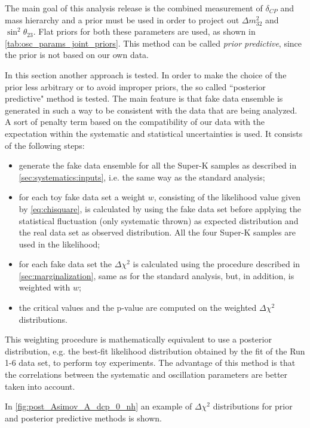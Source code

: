 The main goal of this analysis release is the combined measurement of $\delta_{CP}$ and mass hierarchy
and a prior must be used in order to project out $\Delta m^2_{32}$ and $\sin^2 \theta_{23}$.
Flat priors for both these parameters are used, as shown in \cref{tab:osc_params_joint_priors}.
This method can be called \emph{prior predictive}, since the prior is not based on our own data.

In this section another approach is tested. In order to make the choice of the prior less arbitrary
or to avoid improper priors, 
the so called ``posterior predictive" method is tested.
The main feature is that fake data ensemble is generated in such a way to be consistent with the data that are being analyzed. 
A sort of penalty term based on the compatibility of our data with the expectation within the systematic and statistical uncertainties is used.
It consists of the following steps:
\begin{itemize}
\item generate the fake data ensemble for all the Super-K samples as described in \cref{sec:systematics:inputs},
	i.e. the same way as the standard analysis;
\item for each toy fake data set a weight $w$, consisting of the likelihood value given by \cref{eq:chisquare}, is calculated
	by using the fake data set before applying the statistical fluctuation 
	(only systematic thrown) as expected distribution
	and the real data set as observed distribution.
	All the four Super-K samples are used in the likelihood;
\item for each fake data set the $\Delta \chi^2$ is calculated using the procedure described in \cref{sec:marginalization},
	same as for the standard analysis, but, in addition, is weighted with $w$;
\item the critical values and the p-value are computed on the weighted $\Delta \chi^2$ distributions.
\end{itemize}

This weighting procedure is mathematically equivalent to use a posterior distribution, e.g. the best-fit likelihood distribution
obtained by the fit of the Run 1-6 data set, to perform toy experiments. 
The advantage of this method is that the correlations between the 
systematic and oscillation parameters are better taken into account.


In \cref{fig:post_Asimov_A_dcp_0_nh} an example of $\Delta \chi^2$ distributions for prior and posterior
predictive methods is shown.

